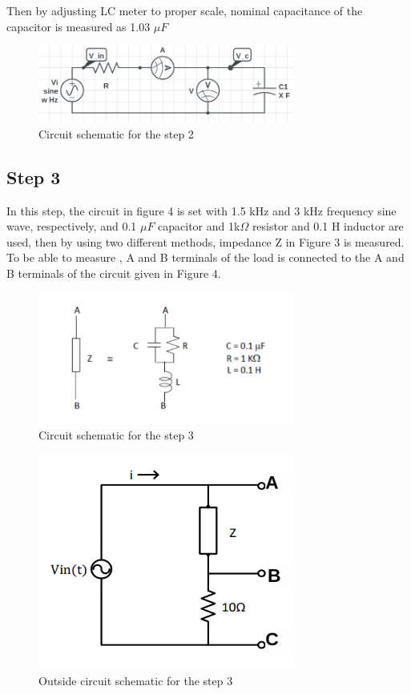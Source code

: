 \documentclass[letterpaper,12pt]{article}
\begin{document}
Then by adjusting LC meter to proper scale, nominal capacitance of the capacitor is measured as 1.03 \(\mu F\)
\begin{figure}[H]
    \centering
    \includegraphics[width = 0.75\textwidth]{2SCH.png}
    \caption{Circuit schematic for the step 2}
\end{figure} 
    
\subsection{Step 3}

In this step, the circuit in figure 4 is set with 1.5 kHz and 3 kHz frequency sine wave, respectively, and 0.1 \(\mu F\) capacitor and 1k\(\Omega \) resistor and 0.1 H inductor are used, then by using two different methods, impedance Z in Figure 3 is measured. To be able to measure , A and B terminals of the load is connected to the A and B terminals of the circuit given in Figure 4.
\begin{figure}[H]
    \centering
    \includegraphics[width = 0.75\textwidth]{3SCH.png}
    \caption{Circuit schematic for the step 3}
\end{figure} 

\begin{figure}[H]
    \centering
    \includegraphics[width = 0.75\textwidth]{3_1SCH.png}
    \caption{Outside circuit schematic for the step 3}
\end{figure} 
\end{document}
